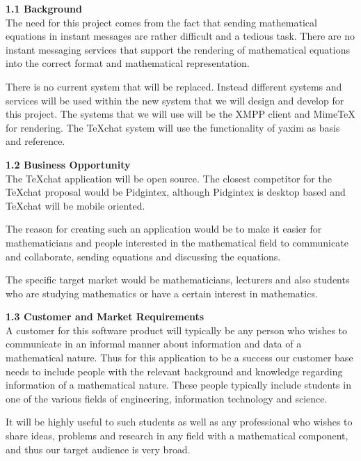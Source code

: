 \documentclass[29pt,a4paper]{moderncv}
\begin{document}
		\textbf{1.1 Background}
		\vspace{4mm}
			\\The need for this project comes from the fact that sending mathematical equations in instant messages are rather difficult and a tedious task. There are no instant messaging services that support the rendering of mathematical equations into the correct format and mathematical representation.
			
			\parindent 5mm There is no current system that will be replaced. Instead different systems and services will be used within the new system that we will design and develop for this project. The systems that we will use will be the XMPP client and MimeTeX for rendering. The TeXchat system will use the functionality of yaxim as basis and reference.
		\vspace{5mm}
		
		\noindent \textbf{1.2 Business Opportunity}
		\vspace{4mm}
			\\The TeXchat application will be open source. The closest competitor for the TeXchat proposal would be Pidgintex, although Pidgintex is desktop based and TeXchat will be mobile oriented. 
			
			\parindent 5mm The reason for creating such an application would be to make it easier for mathematicians and people interested in the mathematical field to communicate and collaborate, sending equations and discussing the equations.
			
			\parindent 5mm The specific target market would be mathematicians, lecturers and also students who are studying mathematics or have a certain interest in mathematics.
		\vspace{5mm}
		
		\noindent \textbf{1.3 Customer and Market Requirements}
		\vspace{4mm}
			\\A customer for this software product will typically be any person who wishes to communicate in an informal manner about information and data of a mathematical nature.  Thus for this application to be a success our customer base needs to include people with the relevant background and knowledge regarding information of a mathematical nature.  These people typically include students in one of the various fields of engineering, information technology and science. 
			
			\parindent 5mm It will be highly useful to such students as well as any professional who wishes to share ideas, problems and research in any field with a mathematical component, and thus our target audience is very broad.
			
\end{document}
